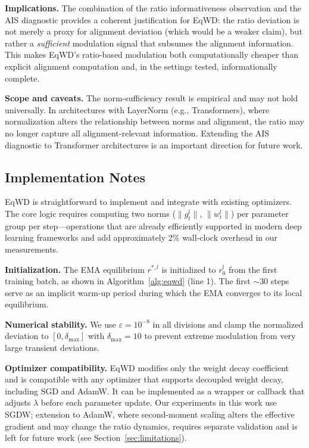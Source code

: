 \documentclass{article}
\begin{document}
\textbf{Implications.} The combination of the ratio informativeness observation and the AIS
diagnostic provides a coherent justification for EqWD: the ratio
deviation is not merely a proxy for alignment deviation (which would be
a weaker claim), but rather a \emph{sufficient} modulation signal that
subsumes the alignment information. This makes EqWD's ratio-based
modulation both computationally cheaper than explicit alignment
computation and, in the settings tested, informationally complete.

\textbf{Scope and caveats.} The norm-sufficiency result is empirical and
may not hold universally. In architectures with LayerNorm (e.g.,
Transformers), where normalization alters the relationship between norms
and alignment, the ratio may no longer capture all alignment-relevant
information. Extending the AIS diagnostic to Transformer architectures
is an important direction for future work.

\subsection{Implementation Notes}
\label{sec:implementation}

EqWD is straightforward to implement and integrate with existing
optimizers. The core logic requires computing two norms ($\|g_t^l\|$,
$\|w_t^l\|$) per parameter group per step---operations that are
already efficiently supported in modern deep learning frameworks and add
approximately 2\% wall-clock overhead in our measurements.

\textbf{Initialization.} The EMA equilibrium $r^{*,l}$ is initialized
to $r_0^l$ from the first training batch, as shown in Algorithm~\ref{alg:eqwd}
(line 1). The first ${\sim}30$ steps serve as an implicit warm-up period
during which the EMA converges to its local equilibrium.

\textbf{Numerical stability.} We use $\varepsilon = 10^{-8}$ in all
divisions and clamp the normalized deviation to
$[0, \delta_{\text{max}}]$ with $\delta_{\text{max}} = 10$ to
prevent extreme modulation from very large transient deviations.

\textbf{Optimizer compatibility.} EqWD modifies only the weight decay
coefficient and is compatible with any optimizer that supports decoupled
weight decay, including SGD and AdamW. It can be implemented as a
wrapper or callback that adjusts $\lambda$ before each parameter
update. Our experiments in this work use SGDW; extension to AdamW, where
second-moment scaling alters the effective gradient and may change the
ratio dynamics, requires separate validation and is left for future work
(see Section~\ref{sec:limitations}).
\end{document}
